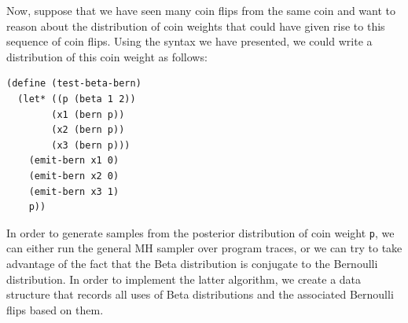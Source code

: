 \documentclass{article}
\begin{document}
Now, suppose that we have seen many coin flips from the same coin and want to
reason about the distribution of coin weights that could have given rise to
this sequence of coin flips. Using the syntax we have presented, we could write
a distribution of this coin weight as follows:
\begin{verbatim}
(define (test-beta-bern)
  (let* ((p (beta 1 2))
        (x1 (bern p))
        (x2 (bern p))
        (x3 (bern p)))
    (emit-bern x1 0)
    (emit-bern x2 0)
    (emit-bern x3 1)
    p))
\end{verbatim}

In order to generate samples from the posterior distribution of coin weight
\verb+p+, we can either run the general MH sampler over program traces, or we
can try to take advantage of the fact that the Beta distribution is conjugate
to the Bernoulli distribution. In order to implement the latter algorithm, we
create a data structure that records all uses of Beta distributions and the
associated Bernoulli flips based on them.  

\begin{verbatim}

\end{verbatim}






\end{document}
